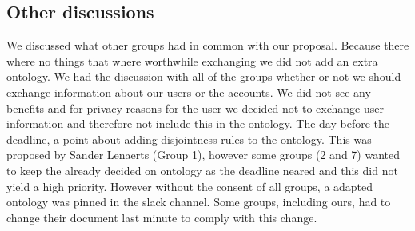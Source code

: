 \subsection{Other discussions}
We discussed what other groups had in common with our proposal. Because there where no things that where worthwhile exchanging we did not add an extra ontology.
\newline
\newline
\noindent
We had the discussion with all of the groups whether or not we should exchange information about our users or the accounts. We did not see any benefits and for privacy reasons for the user we decided not to exchange user information and therefore not include this in the ontology.
\newline
\newline
\noindent
The day before the deadline, a point about adding disjointness rules to the ontology. This was proposed by Sander Lenaerts (Group 1), however some groups (2 and 7) wanted to keep the already decided on ontology as the deadline neared and this did not yield a high priority. However without the consent of all groups, a adapted ontology was pinned in the slack channel. Some groups, including ours, had to change their document last minute to comply with this change.

